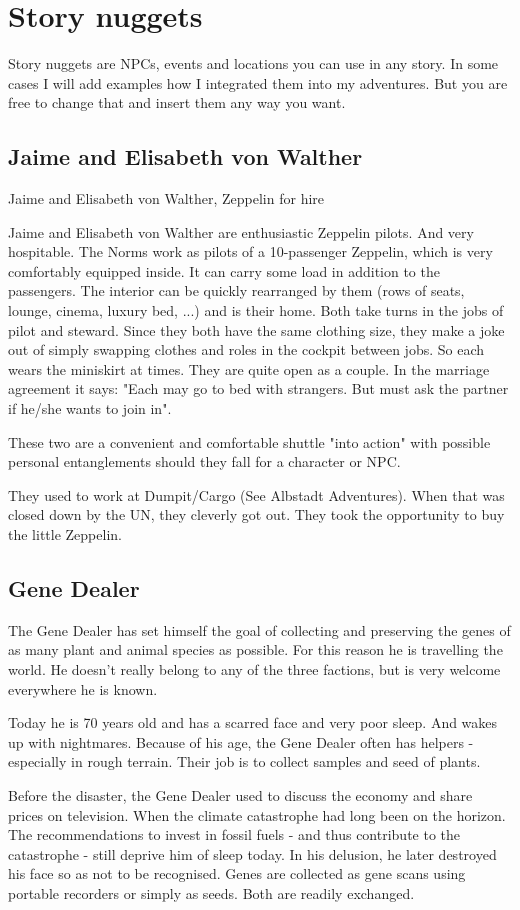 \chapter{Story nuggets}

Story nuggets are NPCs, events and locations you can use in any story. In some cases I will add examples how I integrated them into my adventures. But you are free to change that and insert them any way you want.

\section{Jaime and Elisabeth von Walther}
\label{sec:Jaime and Elisabeth}

Jaime and Elisabeth von Walther, Zeppelin for hire

Jaime and Elisabeth von Walther are enthusiastic Zeppelin pilots. And very hospitable.
The Norms work as pilots of a 10-passenger Zeppelin, which is very comfortably equipped inside. It can carry some load in addition to the passengers.
The interior can be quickly rearranged by them (rows of seats, lounge, cinema, luxury bed, ...) and is their home.
Both take turns in the jobs of pilot and steward. Since they both have the same clothing size, they make a joke out of simply swapping clothes and roles in the cockpit between jobs. So each wears the miniskirt at times.
They are quite open as a couple. In the marriage agreement it says:
"Each may go to bed with strangers. But must ask the partner if he/she wants to join in".

These two are a convenient and comfortable shuttle "into action" with possible personal entanglements should they fall for a character or NPC.

They used to work at Dumpit/Cargo (See Albstadt Adventures). When that was closed down by the UN, they cleverly got out. They took the opportunity to buy the little Zeppelin.

\section{Gene Dealer}
\label{sec:Gene Dealer}

The Gene Dealer has set himself the goal of collecting and preserving the genes of as many plant and animal species as possible.
For this reason he is travelling the world.
He doesn't really belong to any of the three factions, but is very welcome everywhere he is known.

Today he is 70 years old and has a scarred face and very poor sleep. And wakes up with nightmares.
Because of his age, the Gene Dealer often has helpers - especially in rough terrain. Their job is to collect samples and seed of plants.

Before the disaster, the Gene Dealer used to discuss the economy and share prices on television. When the climate catastrophe had long been on the horizon. The recommendations to invest in fossil fuels - and thus contribute to the catastrophe - still deprive him of sleep today. In his delusion, he later destroyed his face so as not to be recognised.
Genes are collected as gene scans using portable recorders or simply as seeds. Both are readily exchanged.
